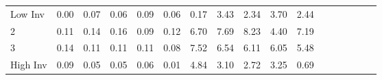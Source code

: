 \begin{table}[!ht]
\begin{tabular}{lrrrrrrrrrrrrrrrr}
    \\
      \cmidrule(r){2-5} \cmidrule(r){6-9} \cmidrule(r){10-13} \cmidrule(r){14-17}

    Low Inv   & 0.00  & 0.07  & 0.06  & 0.09  & 0.06  & 0.17  & 3.43  & 2.34  & 3.70  & 2.44  \\
           2  & 0.11  & 0.14  & 0.16  & 0.09  & 0.12  & 6.70  & 7.69  & 8.23  & 4.40  & 7.19  \\
           3  & 0.14  & 0.11  & 0.11  & 0.11  & 0.08  & 7.52  & 6.54  & 6.11  & 6.05  & 5.48  \\
    High Inv  & 0.09  & 0.05  & 0.05  & 0.06  & 0.01  & 4.84  & 3.10  & 2.72  & 3.25  & 0.69  \\

  

  \bottomrule
\end{tabular}
\label{tbl:25_Size_BM_Inv_C1997b}
\end{table}